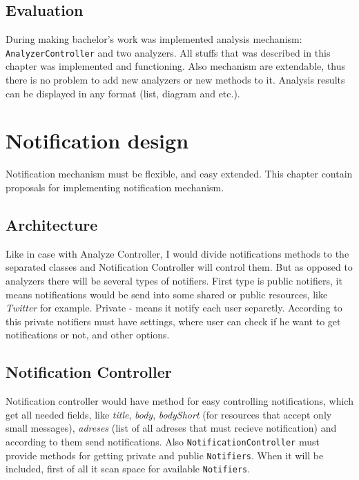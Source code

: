 \section{Evaluation}

During making bachelor's work was implemented analysis mechanism: \texttt{AnalyzerController} and two analyzers. All stuffs that was described in this chapter was implemented and functioning. Also mechanism are extendable, thus there is no problem to add new analyzers or new methods to it. Analysis results can be displayed in any format (list, diagram and etc.).

\chapter{Notification design}
\label{ch:notification_proposal}

Notification mechanism must be flexible, and easy extended. This chapter contain proposals for implementing notification mechanism.

\section{Architecture}

Like in case with Analyze Controller, I would divide notifications methods to the separated classes and Notification Controller will control them. But as opposed to analyzers there will be several types of notifiers. First type is public notifiers, it means notifications would be send into some shared or public resources, like \emph{Twitter} for example. Private - means it notify each user separetly. According to this private notifiers must have settings, where user can check if he want to get notifications or not, and other options.

\section{Notification Controller}

Notification controller would have method for easy controlling notifications, which get all needed fields, like \emph{title}, \emph{body}, \emph{bodyShort} (for resources that accept only small messages), \emph{adreses} (list of all adreses that must recieve notification) and according to them send notifications. Also \texttt{NotificationController} must provide methods for getting private and public \texttt{Notifiers}. When it will be included, first of all it scan space for available \texttt{Notifiers}.

